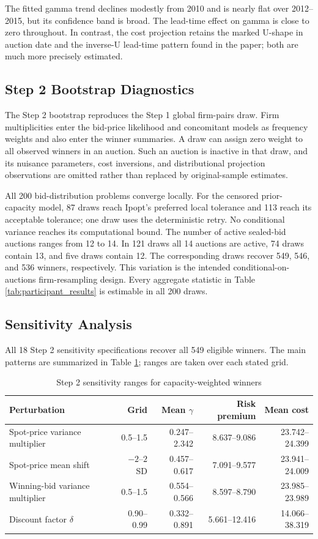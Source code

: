 \documentclass[10pt]{article}
\begin{document}
The fitted gamma trend declines modestly from 2010 and is nearly flat over
2012--2015, but its confidence band is broad. The lead-time effect on gamma is
close to zero throughout. In contrast, the cost projection retains the marked
U-shape in auction date and the inverse-U lead-time pattern found in the paper;
both are much more precisely estimated.

\subsection{Step 2 Bootstrap Diagnostics}

The Step 2 bootstrap reproduces the Step 1 global firm-pairs draw. Firm
multiplicities enter the bid-price likelihood and concomitant models as
frequency weights and also enter the winner summaries. A draw can assign zero
weight to all observed winners in an auction. Such an auction is inactive in
that draw, and its nuisance parameters, cost inversions, and distributional
projection observations are omitted rather than replaced by original-sample
estimates.

All 200 bid-distribution problems converge locally. For the censored
prior-capacity model, 87 draws reach Ipopt's preferred local tolerance and 113
reach its acceptable tolerance; one draw uses the deterministic retry. No
conditional variance reaches its computational bound. The number of active
sealed-bid auctions ranges from 12 to 14. In 121 draws all 14 auctions are
active, 74 draws contain 13, and five draws contain 12. The corresponding
draws recover 549, 546, and 536 winners, respectively. This variation is the
intended conditional-on-auctions
firm-resampling design. Every aggregate statistic in Table
\ref{tab:participant_results} is estimable in all 200 draws.

\subsection{Sensitivity Analysis}

All 18 Step 2 sensitivity specifications recover all 549 eligible winners.
The main patterns are summarized in Table \ref{tab:sensitivity}; ranges are
taken over each stated grid.

\begin{table}[H]
\centering
\small
\caption{Step 2 sensitivity ranges for capacity-weighted winners}
\label{tab:sensitivity}
\begin{tabular}{lrrrr}
\toprule
Perturbation & Grid & Mean $\gamma$ & Risk premium & Mean cost\\
\midrule
Spot-price variance multiplier & 0.5--1.5 & 0.247--2.342 & 8.637--9.086 & 23.742--24.399\\
Spot-price mean shift & $-2$--$2$ SD & 0.457--0.617 & 7.091--9.577 & 23.941--24.009\\
Winning-bid variance multiplier & 0.5--1.5 & 0.554--0.566 & 8.597--8.790 & 23.985--23.989\\
Discount factor $\delta$ & 0.90--0.99 & 0.332--0.891 & 5.661--12.416 & 14.066--38.319\\
\bottomrule
\end{tabular}
\end{table}
\end{document}
